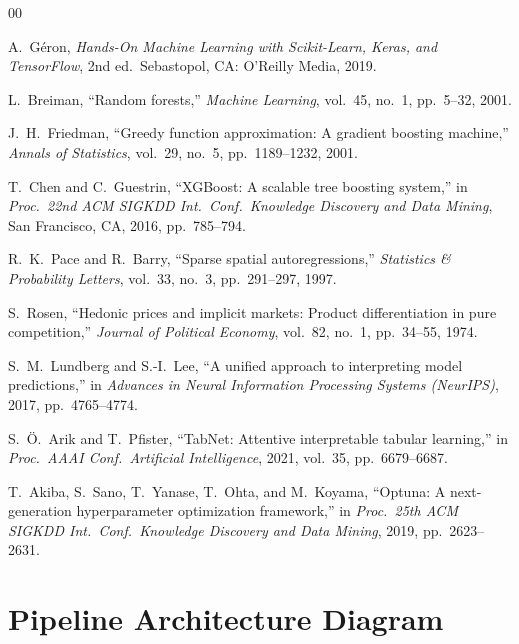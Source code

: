 \documentclass[conference]{IEEEtran}
\begin{document}
\begin{thebibliography}{00}

A.\ Géron, \emph{Hands-On Machine Learning with Scikit-Learn, Keras, and TensorFlow}, 2nd ed.\ Sebastopol, CA: O'Reilly Media, 2019.

L.\ Breiman, ``Random forests,'' \emph{Machine Learning}, vol.\ 45, no.\ 1, pp.\ 5--32, 2001.

J.\ H.\ Friedman, ``Greedy function approximation: A gradient boosting machine,'' \emph{Annals of Statistics}, vol.\ 29, no.\ 5, pp.\ 1189--1232, 2001.

T.\ Chen and C.\ Guestrin, ``XGBoost: A scalable tree boosting system,'' in \emph{Proc.\ 22nd ACM SIGKDD Int.\ Conf.\ Knowledge Discovery and Data Mining}, San Francisco, CA, 2016, pp.\ 785--794.

R.\ K.\ Pace and R.\ Barry, ``Sparse spatial autoregressions,'' \emph{Statistics \& Probability Letters}, vol.\ 33, no.\ 3, pp.\ 291--297, 1997.

S.\ Rosen, ``Hedonic prices and implicit markets: Product differentiation in pure competition,'' \emph{Journal of Political Economy}, vol.\ 82, no.\ 1, pp.\ 34--55, 1974.

S.\ M.\ Lundberg and S.-I.\ Lee, ``A unified approach to interpreting model predictions,'' in \emph{Advances in Neural Information Processing Systems (NeurIPS)}, 2017, pp.\ 4765--4774.

S.\ Ö.\ Arik and T.\ Pfister, ``TabNet: Attentive interpretable tabular learning,'' in \emph{Proc.\ AAAI Conf.\ Artificial Intelligence}, 2021, vol.\ 35, pp.\ 6679--6687.

T.\ Akiba, S.\ Sano, T.\ Yanase, T.\ Ohta, and M.\ Koyama, ``Optuna: A next-generation hyperparameter optimization framework,'' in \emph{Proc.\ 25th ACM SIGKDD Int.\ Conf.\ Knowledge Discovery and Data Mining}, 2019, pp.\ 2623--2631.

\end{thebibliography}

\appendix

\section{Pipeline Architecture Diagram}
\label{app:pipeline}
\end{document}
